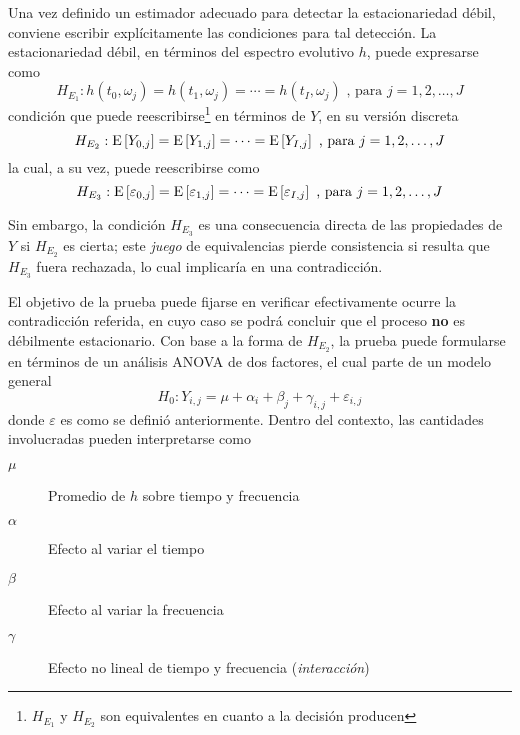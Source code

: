 
Una vez definido un estimador adecuado para detectar la estacionariedad débil, conviene escribir
explícitamente las condiciones para tal detección.
%
La estacionariedad débil, en términos del espectro evolutivo $h$, puede expresarse como
%
\begin{equation*}
H_{E_1} : h(t_0,\omega_j) = h(t_1,\omega_j) = \cdots = h(t_I,\omega_j)
\text{ , para } j = 1, 2, \dots , J
\end{equation*}
%
condición que puede reescribirse\footnote{$H_{E_1}$ y $H_{E_2}$ son equivalentes en cuanto a la
decisión producen} en términos de $Y$, en su versión discreta
%
\begin{equation*}
H_{E_2} : \mathrm{E}\left[ Y_{0,j} \right] = \mathrm{E}\left[ Y_{1,j} \right] = \cdots = \mathrm{E}\left[ Y_{I,j} \right] \text{ , para } j = 1, 2, \dots , J
\end{equation*}
%
la cual, a su vez, puede reescribirse como
\begin{equation*}
H_{E_3} : \mathrm{E}\left[ \varepsilon_{0,j} \right] = \mathrm{E}\left[ \varepsilon_{1,j} \right] = \cdots =
\mathrm{E}\left[ \varepsilon_{I,j} \right] \text{ , para } j = 1, 2, \dots , J
\end{equation*}

Sin embargo, la condición $H_{E_3}$ es una consecuencia directa de las propiedades de $Y$ si
$H_{E_2}$ es cierta; este \textit{juego} de equivalencias pierde consistencia si resulta que
$H_{E_3}$ fuera rechazada, lo cual implicaría en una contradicción.

El objetivo de la prueba puede fijarse en verificar efectivamente ocurre la contradicción
referida, en cuyo caso se podrá concluir que el proceso \textbf{no} es débilmente estacionario.
%
Con base a la forma de $H_{E_2}$, la prueba puede formularse en términos de un análisis ANOVA de dos
factores, el cual parte de un modelo general
%
\begin{equation*}
H_0 : Y_{i,j} = \mu + \alpha_i + \beta_j + \gamma_{i,j} + \varepsilon_{i,j}
\end{equation*}
%
donde $\varepsilon$ es como se definió anteriormente. 
%
Dentro del contexto, las cantidades involucradas pueden interpretarse como
\begin{description}
\item[$\mu$] Promedio de $h$ sobre tiempo y frecuencia
\item[$\alpha$] Efecto al variar el tiempo
\item[$\beta$] Efecto al variar la frecuencia
\item[$\gamma$] Efecto no lineal de tiempo y frecuencia (\textit{interacción})
\end{description}

